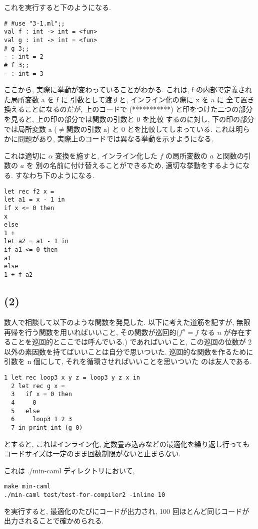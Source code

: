 \documentclass[dvipdfmx]{jsarticle}
\begin{document}
これを実行すると下のようになる.

\begin{lstlisting}[]
# #use "3-1.ml";;
val f : int -> int = <fun>
val g : int -> int = <fun>
# g 3;;
- : int = 2
# f 3;;
- : int = 3
\end{lstlisting}

ここから, 実際に挙動が変わっていることがわかる.
これは, f の内部で定義された局所変数 a を f に
引数として渡すと, インライン化の際に x を a に
全て置き換えることになるのだが, 上のコードで
(***********) と印をつけた二つの部分を見ると, 上の印の部分では関数の引数と 0 を比較
するのに対し, 下の印の部分では局所変数 a ($\neq$関数の引数 a) と 0 とを比較してしまっている.
これは明らかに問題があり, 実際上のコードでは異なる挙動を示すようになる.

これは適切に $\alpha$ 変換を施すと, インライン化した $f$ の局所変数の $a$ と関数の引数の $a$ を
別の名前に付け替えることができるため, 適切な挙動をするようになる.
すなわち下のようになる.

\begin{lstlisting}[]
let rec f2 x =
let a1 = x - 1 in
if x <= 0 then
x
else
1 +
let a2 = a1 - 1 in
if a1 <= 0 then
a1
else
1 + f a2
\end{lstlisting}





\subsection*{(2)}
数人で相談して以下のような関数を発見した.
以下に考えた道筋を記すが,
無限再帰を行う関数を用いればいいこと,
その関数が巡回的($f^n = f$ なる $n$ が存在することを巡回的とここでは呼んでいる.)
であればいいこと, この巡回の位数が 2 以外の素因数を持てばいいことは自分で思いついた.
巡回的な関数を作るために引数を n 個にして, それを循環させればいいことを思いついた
のは友人である.
\begin{lstlisting}[]
  1 let rec loop3 x y z = loop3 y z x in 
  2 let rec g x =
  3   if x = 0 then
  4     0
  5   else
  6     loop3 1 2 3 
  7 in print_int (g 0)
\end{lstlisting}
とすると, これはインライン化, 定数畳み込みなどの最適化を繰り返し行っても
コードサイズは一定のまま回数制限がないと止まらない.

これは ./min-caml ディレクトリにおいて,
\begin{lstlisting}[]
make min-caml
./min-caml test/test-for-compiler2 -inline 10
\end{lstlisting}
を実行すると, 最適化のたびにコードが出力され, 100 回ほとんど同じコードが出力されることで確かめられる.
\end{document}
